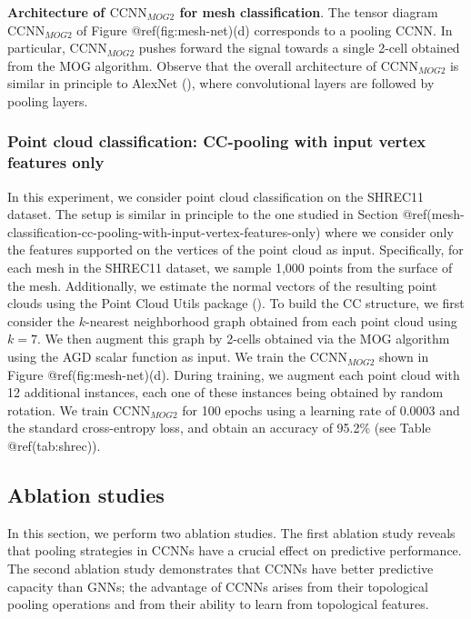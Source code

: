 \documentclass[
  12pt,
]{krantz}
\begin{document}
\textbf{Architecture of \(\mbox{CCNN}_{MOG2}\) for mesh classification}.
The tensor diagram \(\mbox{CCNN}_{MOG2}\) of Figure
@ref(fig:mesh-net)(d) corresponds to a pooling CCNN. In particular,
\(\mbox{CCNN}_{MOG2}\) pushes forward the signal towards a single 2-cell
obtained from the MOG algorithm. Observe that the overall architecture
of \(\mbox{CCNN}_{MOG2}\) is similar in principle to AlexNet
(), where convolutional layers are followed by pooling layers.

\subsubsection{Point cloud classification: CC-pooling with input vertex
features
only}\label{point-cloud-classification-cc-pooling-with-input-vertex-features-only}

In this experiment, we consider point cloud classification on the
SHREC11 dataset. The setup is similar in principle to the one studied in
Section
@ref(mesh-classification-cc-pooling-with-input-vertex-features-only)
where we consider only the features supported on the vertices of the
point cloud as input. Specifically, for each mesh in the SHREC11
dataset, we sample 1,000 points from the surface of the mesh.
Additionally, we estimate the normal vectors of the resulting point
clouds using the Point Cloud Utils package
(). To build the CC
structure, we first consider the \(k\)-nearest neighborhood graph
obtained from each point cloud using \(k=7\). We then augment this graph
by 2-cells obtained via the MOG algorithm using the AGD scalar function
as input. We train the \(\mbox{CCNN}_{MOG2}\) shown in Figure
@ref(fig:mesh-net)(d). During training, we augment each point cloud with
12 additional instances, each one of these instances being obtained by
random rotation. We train \(\mbox{CCNN}_{MOG2}\) for 100 epochs using a
learning rate of 0.0003 and the standard cross-entropy loss, and obtain
an accuracy of 95.2\% (see Table @ref(tab:shrec)).

\subsection{Ablation studies}\label{ablation-studies}

In this section, we perform two ablation studies. The first ablation
study reveals that pooling strategies in CCNNs have a crucial effect on
predictive performance. The second ablation study demonstrates that
CCNNs have better predictive capacity than GNNs; the advantage of CCNNs
arises from their topological pooling operations and from their ability
to learn from topological features.
\end{document}
